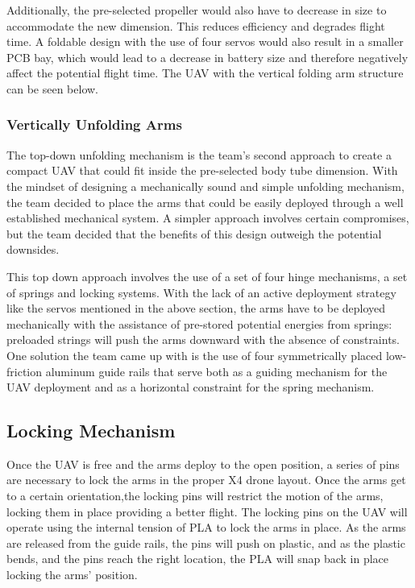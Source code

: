 			Additionally, the pre-selected propeller would also have to decrease in size to accommodate the new dimension. This reduces efficiency and degrades flight time. A foldable design with the use of four servos would also result in a smaller PCB bay, which would lead to a decrease in battery size and therefore negatively affect the potential flight time. The UAV with the vertical folding arm structure can be seen below.
		

		\subsubsection{Vertically Unfolding Arms}
			The top-down unfolding mechanism is the team’s second approach to create a compact UAV that could fit inside the pre-selected body tube dimension. With the mindset of designing a mechanically sound and simple unfolding mechanism, the team decided to place the arms that could be easily deployed through a well established mechanical system. A simpler approach involves certain compromises, but the team decided that the benefits of this design outweigh the potential downsides. 

			This top down approach involves the use of a set of four hinge mechanisms, a set of springs and locking systems. With the lack of an active deployment strategy like the servos mentioned in the above section, the arms have to be deployed mechanically with the assistance of pre-stored potential energies from springs: preloaded strings will push the arms downward with the absence of constraints. One solution the team came up with is the use of four symmetrically placed low-friction aluminum guide rails that serve both as a guiding mechanism for the UAV deployment and as a horizontal constraint for the spring mechanism.
	
	\subsection{Locking Mechanism}
    Once the UAV is free and the arms deploy to the open position, a series of pins are necessary to lock the arms in the proper X4 drone layout.  Once the arms get to a certain orientation,the locking pins will restrict the motion of the arms, locking them in place providing a better flight.  The locking pins on the UAV will operate using the internal tension of PLA to lock the arms in place.  As the arms are released from the guide rails, the pins will push on plastic, and as the plastic bends, and the pins reach the right location, the PLA will snap back in place locking the arms’ position.   


